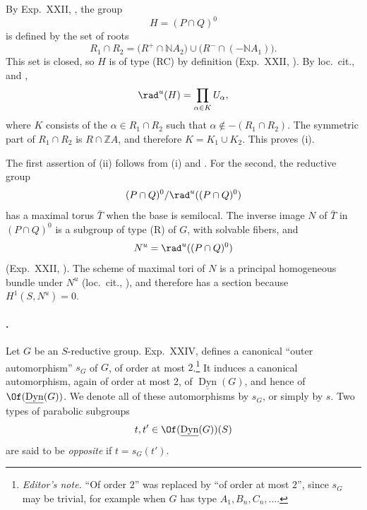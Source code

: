 By Exp.\ XXII, , the group
\[
 H=(P\cap Q)^0
\]
is defined by the set of roots
\[
 R_1\cap R_2
 =
 \bigl(R^+\cap\mathbb N A_2\bigr)
 \cup
 \bigl(R^-\cap(-\mathbb N A_1)\bigr).
\]
This set is closed, so \(H\) is of type \textup{(RC)} by definition
(Exp.\ XXII, ).  By loc.\ cit.,  and ,
\[
 \rad^u(H)=\prod_{\alpha\in K}U_\alpha,
\]
where \(K\) consists of the \(\alpha\in R_1\cap R_2\) such that
\(\alpha\notin-(R_1\cap R_2)\).  The symmetric part of
\(R_1\cap R_2\) is \(R\cap\mathbb ZA\), and therefore
\(K=K_1\cup K_2\).  This proves \textup{(i)}.

The first assertion of \textup{(ii)} follows from \textup{(i)} and
.  For the second, the reductive group
\[
 (P\cap Q)^0/\rad^u((P\cap Q)^0)
\]
has a maximal torus \(\bar T\) when the base is semilocal.  The inverse
image \(N\) of \(\bar T\) in \((P\cap Q)^0\) is a subgroup of type
\textup{(R)} of \(G\), with solvable fibers, and
\[
 N^u=\rad^u((P\cap Q)^0)
\]
(Exp.\ XXII, ).  The scheme of maximal tori of \(N\) is a
principal homogeneous bundle under \(N^u\) (loc.\ cit., ), and
therefore has a section because \(H^1(S,N^u)=0\).
\SGAQED



\paragraph{.}
Let \(G\) be an \(S\)-reductive group.  Exp.\ XXIV,  defines a
canonical ``outer automorphism'' \(s_G\) of \(G\), of order at most
\(2\).\footnote{\emph{Editor's note.} ``Of order \(2\)'' was replaced
by ``of order at most \(2\)'', since \(s_G\) may be trivial, for example
when \(G\) has type \(A_1,B_n,C_n,\ldots\).}  It induces a canonical
automorphism, again of order at most \(2\), of
\(\underline{\operatorname{Dyn}}(G)\), and hence of
\(\Of(\underline{\operatorname{Dyn}}(G))\).  We denote all of these
automorphisms by \(s_G\), or simply by \(s\).  Two types of parabolic
subgroups
\[
 t,t'\in\Of(\underline{\operatorname{Dyn}}(G))(S)
\]
are said to be \emph{opposite} if \(t=s_G(t')\).


